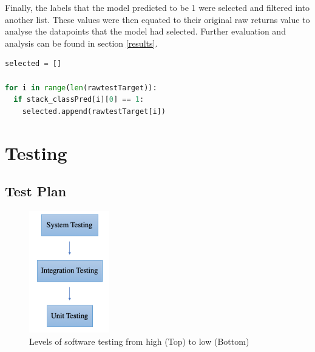 \documentclass[10pt,onecolumn,letterpaper]{article}
\begin{document}
Finally, the labels that the model predicted to be 1 were selected and filtered into another list. These values were then equated to their original raw returns value to analyse the datapoints that the model had selected. Further evaluation and analysis can be found in section \ref{results}.

\begin{lstlisting}[language=Python, breaklines=true, caption={Filtering out positively labelled predictions to extract related actual return.}]
selected = []

for i in range(len(rawtestTarget)):
  if stack_classPred[i][0] == 1: 
    selected.append(rawtestTarget[i])
\end{lstlisting} 

\newpage

\section{Testing}

\subsection{Test Plan} 

\begin{figure}[!hbt!]
\centering
\includegraphics[width=3.5cm]{evaluation.png}
\caption{Levels of software testing from high (Top) to low (Bottom)}
\end{figure}
\end{document}
